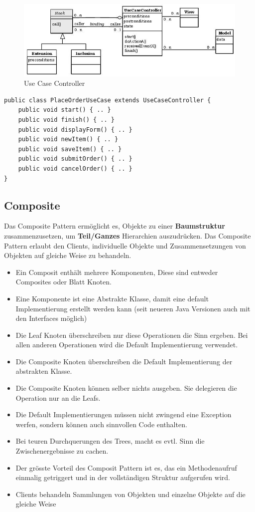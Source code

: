 \begin{figure}[h]
	\centering
	\includegraphics[width=0.7\linewidth]{images/usecasecontrolller_pattern}
	\caption{Use Case Controller}
	\label{fig:usecasecontrolllerpattern}
\end{figure}


\begin{lstlisting}
public class PlaceOrderUseCase extends UseCaseController {
	public void start() { .. }
	public void finish() { .. }
	public void displayForm() { .. }
	public void newItem() { .. }
	public void saveItem() { .. }
	public void submitOrder() { .. }
	public void cancelOrder() { .. }
}
\end{lstlisting}


\clearpage

\subsection{Composite}
\label{sec:composite}
Das Composite Pattern ermöglicht es, Objekte zu einer \textbf{Baumstruktur} zusammenzusetzen, um \textbf{Teil/Ganzes} Hierarchien auszudrücken. Das Composite Pattern erlaubt den Clients, individuelle Objekte und Zusammensetzungen von Objekten auf gleiche Weise zu behandeln.
\begin{itemize}
	\item Ein Composit enthält mehrere Komponenten, Diese sind entweder Composites oder Blatt Knoten.
	\item Eine Komponente ist eine Abstrakte Klasse, damit eine default Implementierung erstellt werden kann (seit neueren Java Versionen auch mit den Interfaces möglich)
	\item Die Leaf Knoten überschreiben nur diese Operationen die Sinn ergeben. Bei allen anderen Operationen wird die Default Implementierung verwendet.
	\item Die Composite Knoten überschreiben die Default Implementierung der abstrakten Klasse.
	\item Die Composite Knoten können selber nichts ausgeben. Sie delegieren die Operation nur an die Leafs.
	\item Die Default Implementierungen müssen nicht zwingend eine Exception werfen, sondern können auch sinnvollen Code enthalten.
	\item Bei teuren Durchquerungen des Trees, macht es evtl. Sinn die Zwischenergebnisse zu cachen.
	\item Der grösste Vorteil des Composit Pattern ist es, das ein Methodenaufruf einmalig getriggert und in der vollständigen Struktur aufgerufen wird. \item Clients behandeln Sammlungen von Objekten und einzelne Objekte auf die gleiche Weise
\end{itemize}

